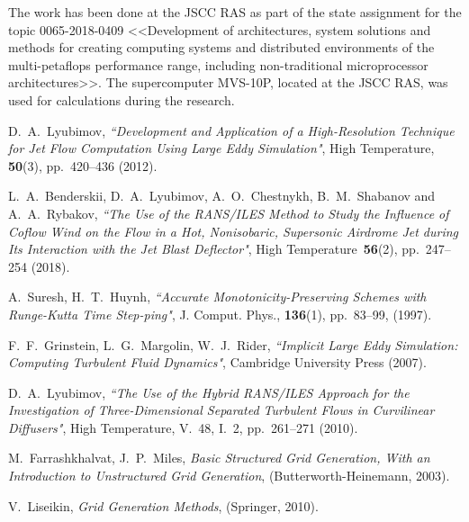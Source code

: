 \documentclass[
11pt,%
tightenlines,%
twoside,%
onecolumn,%
nofloats,%
nobibnotes,%
nofootinbib,%
superscriptaddress,%
noshowpacs,%
centertags]%
{revtex4}
\begin{document}
\begin{acknowledgments}
The work has been done at the JSCC RAS as part of the state assignment for the topic 0065-2018-0409 <<Development of architectures, system solutions and methods for creating computing systems and distributed environments of the multi-petaflops performance range, including non-traditional microprocessor architectures>>. The supercomputer MVS-10P, located at the JSCC RAS, was used for calculations during the research.
\end{acknowledgments}

\begin{thebibliography}{99}


D.~A.~Lyubimov, {\it ``Development and Application of a High-Resolution Technique for Jet Flow Computation Using Large Eddy Simulation"}, High Temperature, {\bf 50}(3), pp.~420--436 (2012).

L.~A.~Benderskii, D.~A.~Lyubimov, A.~O.~Chestnykh, B.~M.~Shabanov and A.~A.~Rybakov, {\it ``The Use of the RANS/ILES Method to Study the Influence of Coflow Wind on the Flow in a Hot, Nonisobaric, Supersonic Airdrome Jet during Its Interaction with the Jet Blast Deflector"}, High Temperature~{\bf 56}(2), pp.~247--254 (2018).

A.~Suresh, H.~T.~Huynh, {\it ``Accurate Monotonicity-Preserving Schemes with Runge-Kutta Time Step-ping"}, J. Comput. Phys., {\bf 136}(1), pp.~83--99, (1997).

F.~F.~Grinstein, L.~G.~Margolin, W.~J.~Rider, {\it ``Implicit Large Eddy Simulation: Computing Turbulent Fluid Dynamics"}, Cambridge University Press (2007).


D.~A.~Lyubimov, {\it ``The Use of the Hybrid RANS/ILES Approach for the Investigation of Three-Dimensional Separated Turbulent Flows in Curvilinear Diffusers"}, High Temperature, V.~48, I.~2, pp.~261--271 (2010).


M.~Farrashkhalvat, J.~P.~Miles, \emph{Basic Structured Grid Generation, With an Introduction to Unstructured Grid Generation}, (Butterworth-Heinemann, 2003).

V.~Liseikin, \emph{Grid Generation Methods}, (Springer, 2010).


\end{thebibliography}
\end{document}
